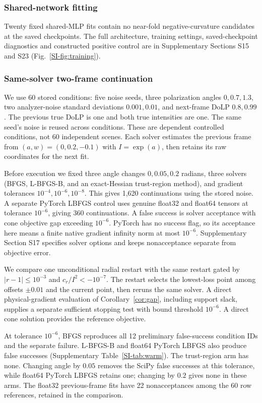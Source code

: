 \documentclass[pdflatex,sn-mathphys-num]{sn-jnl}
\begin{document}
\subsubsection{Shared-network fitting}
Twenty fixed shared-MLP fits contain no near-fold negative-curvature candidates at the saved checkpoints. The full architecture, training settings, saved-checkpoint diagnostics and constructed positive control are in Supplementary Sections S15 and S23 (Fig.~\ref{SI-fig:training}).

\subsubsection{Same-solver two-frame continuation}
\label{sec:warmexperiment}
We use 60 stored conditions: five noise seeds, three polarization angles $0,0.7,1.3$, two analyzer-noise standard deviations $0.001,0.01$, and next-frame DoLP $0.8,0.99$. The previous true DoLP is one and both true intensities are one. The same seed's noise is reused across conditions. These are dependent controlled conditions, not 60 independent scenes. Each solver estimates the previous frame from $(a,w)=(0,0.2,-0.1)$ with $I=\exp(a)$, then retains its raw coordinates for the next fit.

Before execution we fixed three angle changes $0,0.05,0.2$ radians, three solvers (BFGS, L-BFGS-B, and an exact-Hessian trust-region method), and gradient tolerances $10^{-4},10^{-6},10^{-8}$. This gives 1,620 continuations using the stored noise. A separate PyTorch LBFGS control uses genuine float32 and float64 tensors at tolerance $10^{-6}$, giving 360 continuations. A false success is solver acceptance with cone objective gap exceeding $10^{-6}$. PyTorch has no success flag, so its acceptance here means a finite native gradient infinity norm at most $10^{-6}$. Supplementary Section S17 specifies solver options and keeps nonacceptance separate from objective error.

We compare one unconditional radial restart with the same restart gated by $|r-1|\leq10^{-3}$ and $c_r/I^2<-10^{-7}$. The restart selects the lowest-loss point among offsets $\pm0.01$ and the current point, then reruns the same solver. A direct physical-gradient evaluation of Corollary~\ref{cor:gap}, including support slack, supplies a separate sufficient stopping test with bound threshold $10^{-6}$. A direct cone solution provides the reference objective.



At tolerance $10^{-6}$, BFGS reproduces all 12 preliminary false-success condition IDs and the separate failure. L-BFGS-B and float64 PyTorch LBFGS also produce false successes (Supplementary Table~\ref{SI-tab:warm}). The trust-region arm has none. Changing angle by $0.05$ removes the SciPy false successes at this tolerance, while float64 PyTorch LBFGS retains one; changing by $0.2$ gives none in these arms. The float32 previous-frame fits have 22 nonacceptances among the 60 row references, retained in the comparison.
\end{document}
